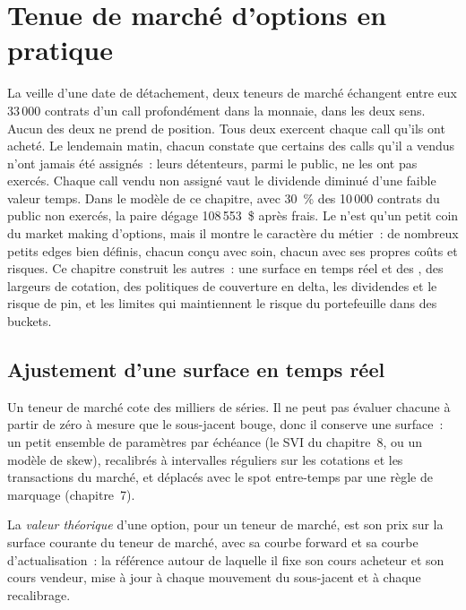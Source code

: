 \chapter{Tenue de marché d'options en pratique}\label{ch:dv:options-market-making-in-practice}

La veille d'une date de détachement, deux teneurs de marché échangent entre eux 33\,000 contrats d'un call profondément dans la monnaie, dans les deux sens.
Aucun des deux ne prend de position. Tous deux exercent chaque call qu'ils ont acheté. Le lendemain matin, chacun constate que certains des calls qu'il a vendus n'ont jamais été assignés~:
leurs détenteurs, parmi le public, ne les ont pas exercés. Chaque call vendu non assigné vaut le dividende diminué d'une faible valeur temps. Dans le
modèle de ce chapitre, avec 30~\% des 10\,000 contrats du public non exercés, la paire dégage 108\,553~\$ après frais. Le  n'est qu'un petit coin du
market making d'options, mais il montre le caractère du métier~: de nombreux petits edges bien définis, chacun conçu avec soin, chacun avec ses propres coûts et risques. Ce
chapitre construit les autres~: une surface en temps réel et des , des largeurs de cotation, des politiques de couverture en delta, les dividendes et le risque de pin, et les
limites qui maintiennent le risque du portefeuille dans des buckets.

\section{Ajustement d'une surface en temps réel}

Un teneur de marché cote des milliers de séries. Il ne peut pas évaluer chacune à partir de zéro à mesure que le sous-jacent bouge, donc il conserve une surface~: un petit ensemble de
paramètres par échéance (le SVI du chapitre~8, ou un modèle de skew), recalibrés à intervalles réguliers sur les cotations et les transactions du marché, et déplacés avec le spot
entre-temps par une règle de marquage (chapitre~7).

\begin{definition}\label{def:dv:options-market-making-in-practice:theo}
La \emph{valeur théorique} d'une option, pour un teneur de marché, est son prix sur la surface courante du teneur de marché,
avec sa courbe forward et sa courbe d'actualisation~: la référence autour de laquelle il fixe son cours acheteur et son cours vendeur, mise à jour à chaque mouvement du sous-jacent et à chaque recalibrage.
\end{definition}

